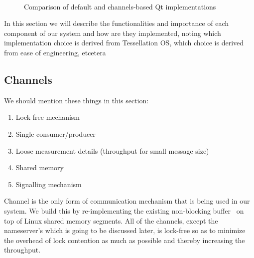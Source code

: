 \documentclass[letterpaper,twocolumn,10pt]{article}
\begin{document}
\begin{figure}[t]
\begin{center}
     \\
  \end{center}
  \caption{Comparison of default and channels-based Qt implementations}
  \label{fig:implementation}
\end{figure}

In this section we will describe the functionalities and importance of each component of our system and how are they implemented, noting which implementation choice is derived from Tessellation OS, which choice is derived from ease of engineering, etcetera
 
\subsection{Channels}
We should mention these things in this section:
\begin{enumerate}
\item Lock free mechanism
\item Single consumer/producer
\item Loose measurement details (throughput for small message size)
\item Shared memory
\item Signalling mechanism
\end{enumerate}

Channel is the only form of communication mechanism that is being used in our system. We build this by re-implementing the existing non-blocking buffer~\cite{Kim:2007:EAN:1260991.1261857} on top of Linux shared memory segments. All of the channels, except the nameserver's which is going to be discussed later, is lock-free so as to minimize the overhead of lock contention as much as possible and thereby increasing the throughput.
\end{document}
